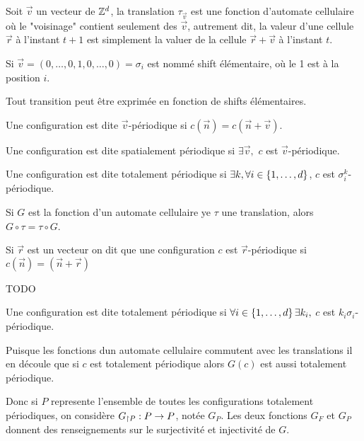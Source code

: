 \begin{definition}
	Soit $\vec v$ un vecteur de $\mathbb{Z}^d$, la translation $\tau_{\vec v}$ est une fonction d'automate cellulaire où le "voisinage" contient seulement des $\vec v$,
	autrement dit, la valeur d'une cellule $\vec r$ à l'instant $t+1$ est simplement la valuer de la cellule $\vec r + \vec v$ à l'instant $t$.


	Si $\vec v = (0,\ldots,0, 1, 0, \ldots, 0) = \sigma_i$ est nommé shift élémentaire, où le 1 est à la position $i$.

	Tout transition peut être exprimée en fonction de shifts élémentaires.
\end{definition}

\begin{definition}
	Une configuration est dite $\vec v$-périodique si $c(\vec n) = c (\vec n + \vec v)$.
\end{definition}

\begin{definition}
	Une configuration est dite spatialement périodique si $\exists \vec v,$ \tq $c$ est $\vec v$-périodique.
\end{definition}


\begin{definition}
	Une configuration est dite totalement périodique si $\exists k, \forall i \in \left\{1,\ldots,d\right\}$, $c$ est $\sigma_i^k$-périodique.
\end{definition}

\begin{prop}
	Si $G$ est la fonction d'un automate cellulaire ye $\tau$ une translation, alors $G \circ \tau = \tau \circ G$.
\end{prop}

\begin{definition}
	Si $\vec r$ est un vecteur on dit que une configuration $c$ est $\vec r$-périodique si $c(\vec n) = (\vec n + \vec r)$
\end{definition}

\begin{exemple}
	TODO
\end{exemple}

\begin{definition}
	Une configuration est dite totalement périodique si $\forall i \in \left\{1,\ldots,d\right\}\exists k_i, $ \tq $c$ est $k_i\sigma_i$-périodique.
\end{definition}

\begin{remarque}
	Puisque les fonctions dun automate cellulaire commutent avec les translations il en découle que si $c$ est totalement périodique alors $G(c)$
	est aussi totalement périodique.

	Donc si $P$ represente l'ensemble de toutes les configurations totalement périodiques, on considère $G_{\restriction P} : P \to P$, notée $G_P$.
	Les deux fonctions $G_F$ et $G_P$ donnent des renseignements sur le surjectivité et injectivité de $G$.
\end{remarque}


